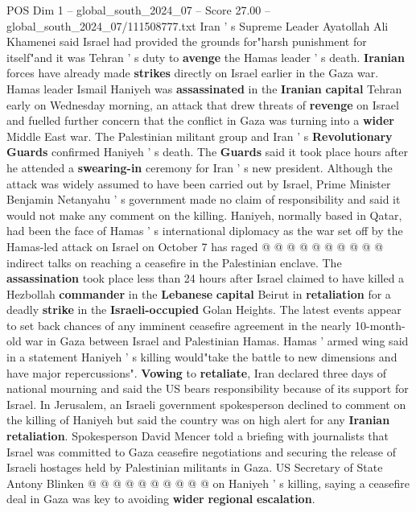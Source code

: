\begin{textsample}{POS Dim 1 – global\_south\_2024\_07 – Score 27.00 – global\_south\_2024\_07/111508777.txt}  \label{ex:f1_pos_063}
Iran ' s Supreme Leader Ayatollah Ali Khamenei said Israel had provided the grounds for"harsh punishment for itself"and it was Tehran ' s duty to \textbf{avenge} the Hamas leader ' s death. \textbf{Iranian} forces have already made \textbf{strikes} directly on Israel earlier in the Gaza war.
Hamas leader Ismail Haniyeh was \textbf{assassinated} in the \textbf{Iranian} \textbf{capital} Tehran early on Wednesday morning, an attack that drew threats of \textbf{revenge} on Israel and fuelled further concern that the conflict in Gaza was turning into a \textbf{wider} Middle East war.
The Palestinian militant group and Iran ' s \textbf{Revolutionary} \textbf{Guards} confirmed Haniyeh ' s death.
The \textbf{Guards} said it took place hours after he attended a \textbf{swearing-in} ceremony for Iran ' s new president.
Although the attack was widely assumed to have been carried out by Israel, Prime Minister Benjamin Netanyahu ' s government made no claim of responsibility and said it would not make any comment on the killing.
Haniyeh, normally based in Qatar, had been the face of Hamas ' s international diplomacy as the war set off by the Hamas-led attack on Israel on October 7 has raged @ @ @ @ @ @ @ @ @ @ indirect talks on reaching a ceasefire in the Palestinian enclave.
The \textbf{assassination} took place less than 24 hours after Israel claimed to have killed a Hezbollah \textbf{commander} in the \textbf{Lebanese} \textbf{capital} Beirut in \textbf{retaliation} for a deadly \textbf{strike} in the \textbf{Israeli-occupied} Golan Heights.
The latest events appear to set back chances of any imminent ceasefire agreement in the nearly 10-month-old war in Gaza between Israel and Palestinian Hamas.
Hamas ' armed wing said in a statement Haniyeh ' s killing would"take the battle to new dimensions and have major repercussions". \textbf{Vowing} to \textbf{retaliate}, Iran declared three days of national mourning and said the US bears responsibility because of its support for Israel.
In Jerusalem, an Israeli government spokesperson declined to comment on the killing of Haniyeh but said the country was on high alert for any \textbf{Iranian} \textbf{retaliation}.
Spokesperson David Mencer told a briefing with journalists that Israel was committed to Gaza ceasefire negotiations and securing the release of Israeli hostages held by Palestinian militants in Gaza.
US Secretary of State Antony Blinken @ @ @ @ @ @ @ @ @ @ on Haniyeh ' s killing, saying a ceasefire deal in Gaza was key to avoiding \textbf{wider} \textbf{regional} \textbf{escalation}.

\end{textsample}
